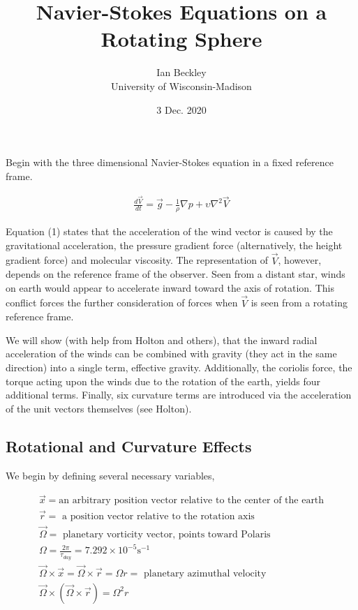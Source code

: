 \documentclass[a4paper,12pt]{article}
\begin{document}
\title{\vspace{-4.0cm}Navier-Stokes Equations on a Rotating Sphere}
\author{Ian Beckley
\\University of Wisconsin-Madison}

\date{3 Dec. 2020}

\maketitle
Begin with the three dimensional Navier-Stokes equation in a fixed reference frame.

\begin{align}
\frac{d \vec V}{dt} = \vec g - \frac{1}{\rho}\nabla p + \upsilon \nabla^2 \vec V
\end{align}

Equation (1) states that the acceleration of the wind vector is caused by the gravitational acceleration, the pressure gradient force (alternatively, the height gradient force) and molecular viscosity. The representation of $\vec V$, however, depends on the reference frame of the observer. Seen from a distant star, winds on earth would appear to accelerate inward toward the axis of rotation. This conflict forces the further consideration of forces when $\vec V$ is seen from a rotating reference frame. 

We will show (with help from Holton and others), that the inward radial acceleration of the winds can be combined with gravity (they act in the same direction) into a single term, effective gravity. Additionally, the coriolis force, the torque acting upon the winds due to the rotation of the earth, yields four additional terms. Finally, six curvature terms are introduced via the acceleration of the unit vectors themselves (see Holton).

\subsection*{Rotational and Curvature Effects}

We begin by defining several necessary variables,

\begin{align*}
\vec x = \text{an arbitrary position vector relative to the center of the earth}\\
\vec r = \text{ a position vector relative to the rotation axis}\\
\vec \Omega = \text{ planetary vorticity vector, points toward Polaris}\\
\Omega = \frac{2\pi}{\tau_{day}} = 7.292 \times 10^{-5} \text{s}^{-1}\\
\vec \Omega \times \vec x = \vec \Omega \times \vec r = \Omega r = \text{ planetary azimuthal velocity}\\
\vec \Omega \times (\vec \Omega \times \vec r) = \Omega^{2} r
\end{align*}
\end{document}
